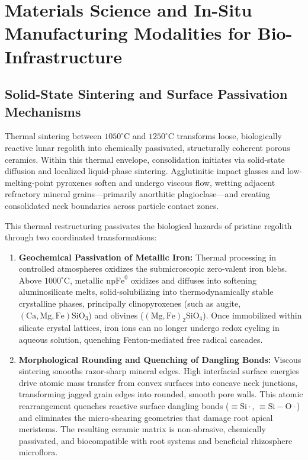 \section{Materials Science and In-Situ Manufacturing Modalities for Bio-Infrastructure}
\label{sec:manufacturing}

\subsection{Solid-State Sintering and Surface Passivation Mechanisms}
\label{subsec:sintering_mechanisms}

Thermal sintering between $1050^\circ\mathrm{C}$ and $1250^\circ\mathrm{C}$ transforms loose, biologically reactive lunar regolith into chemically passivated, structurally coherent porous ceramics\cite{ming1989lunar,xi2026multiphysics,sperl2017influence}. Within this thermal envelope, consolidation initiates via solid-state diffusion and localized liquid-phase sintering\cite{ming1989lunar}. Agglutinitic impact glasses and low-melting-point pyroxenes soften and undergo viscous flow, wetting adjacent refractory mineral grains---primarily anorthitic plagioclase---and creating consolidated neck boundaries across particle contact zones\cite{ming1989lunar,xi2026multiphysics}.

This thermal restructuring passivates the biological hazards of pristine regolith through two coordinated transformations\cite{ming1989lunar}:
\begin{enumerate}
    \item \textbf{Geochemical Passivation of Metallic Iron:} Thermal processing in controlled atmospheres oxidizes the submicroscopic zero-valent iron blebs\cite{ming1989lunar}. Above $1000^\circ\mathrm{C}$, metallic $\mathrm{npFe}^0$ oxidizes and diffuses into softening aluminosilicate melts, solid-solubilizing into thermodynamically stable crystalline phases, principally clinopyroxenes (such as augite, $(\mathrm{Ca, Mg, Fe})\mathrm{SiO}_3$) and olivines ($(\mathrm{Mg, Fe})_2\mathrm{SiO}_4$)\cite{ming1989lunar,hendrix2019measurement,meek1993mechanical}. Once immobilized within silicate crystal lattices, iron ions can no longer undergo redox cycling in aqueous solution, quenching Fenton-mediated free radical cascades\cite{paul2022plants,ming1989lunar}.
    \item \textbf{Morphological Rounding and Quenching of Dangling Bonds:} Viscous sintering smooths razor-sharp mineral edges\cite{ming1989lunar}. High interfacial surface energies drive atomic mass transfer from convex surfaces into concave neck junctions, transforming jagged grain edges into rounded, smooth pore walls\cite{ming1989lunar}. This atomic rearrangement quenches reactive surface dangling bonds ($\equiv\!\mathrm{Si}\cdot$, $\equiv\!\mathrm{Si}-\mathrm{O}\cdot$) and eliminates the micro-shearing geometries that damage root apical meristems\cite{ming1989lunar,turci2015mechanistic,xi2026multiphysics}. The resulting ceramic matrix is non-abrasive, chemically passivated, and biocompatible with root systems and beneficial rhizosphere microflora\cite{ming1989lunar,hendrix2024reactivity}.
\end{enumerate}

